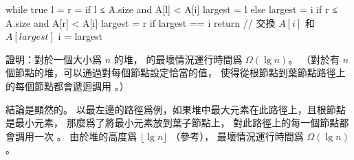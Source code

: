 \startANSWER
{}
\startCLRSCODE
while true
	l = 
	r = 
	if l ≤ A.size and A[l] < A[i]
		largest = l
	else
		largest = i
	if r ≤ A.size and A[r] < A[i]
		largest = r
	if largest == i
		return
	// 交換 $A[i]$ 和 $A[largest]$
	i = largest
\stopCLRSCODE
\stopANSWER

\blank

\startEXERCISE
證明：對於一個大小爲 $n$ 的堆，  的最壞情況運行時間爲 $\Omega(\lg{n})$。
（\hint 對於有 $n$ 個節點的堆，可以通過對每個節點設定恰當的值，
使得從根節點到葉節點路徑上的每個節點都會遞迴調用 。）
\stopEXERCISE

\startANSWER
結論是顯然的。
以最左邊的路徑爲例，如果堆中最大元素在此路徑上，且根節點是最小元素，
那麼爲了將最小元素放到葉子節點上，
對此路徑上的每一個節點都會調用一次 。
由於堆的高度爲 $\lfloor \lg{n} \rfloor$ （參考），
最壞情況運行時間爲 $\Omega(\lg{n})$。
\stopANSWER

\stopsection
